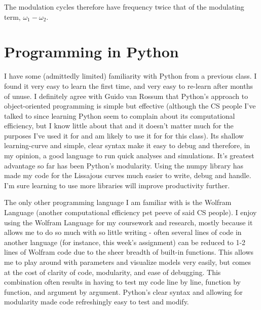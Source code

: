 \documentclass[11pt]{article}
\begin{document}
The modulation cycles therefore have frequency twice that of the modulating term, $\omega_1-\omega_2$.
\newpage

\section{Programming in Python}
I have some (admittedly limited) familiarity with Python from a previous class. I found it very easy to learn the first time, and very easy to re-learn after months of unuse. I definitely agree with Guido van Rossum that Python's approach to object-oriented programming is simple but effective (although the CS people I've talked to since learning Python seem to complain about its computational efficiency, but I know little about that and it doesn't matter much for the purposes I've used it for and am likely to use it for for this class). Its shallow learning-curve and simple, clear syntax make it easy to debug and therefore, in my opinion, a good language to run quick analyses and simulations. It's greatest advantage so far has been Python's modularity. Using the numpy library has made my code for the Lissajous curves much easier to write, debug and handle. I'm sure learning to use more libraries will improve productivity further.

The only other programming language I am familiar with is the Wolfram Language (another computational efficiency pet peeve of said CS people). I enjoy using the Wolfram Language for my coursework and research, mostly because it allows me to do so much with so little writing - often several lines of code in another language (for instance, this week's assignment) can be reduced to 1-2 lines of Wolfram code due to the sheer breadth of built-in functions. This allows me to play around with parameters and visualize models very easily, but comes at the cost of clarity of code, modularity, and ease of debugging. This combination often results in having to test my code line by line, function by function, and argument by argument. Python's clear syntax and allowing for modularity made code refreshingly easy to test and modify.
\end{document}
